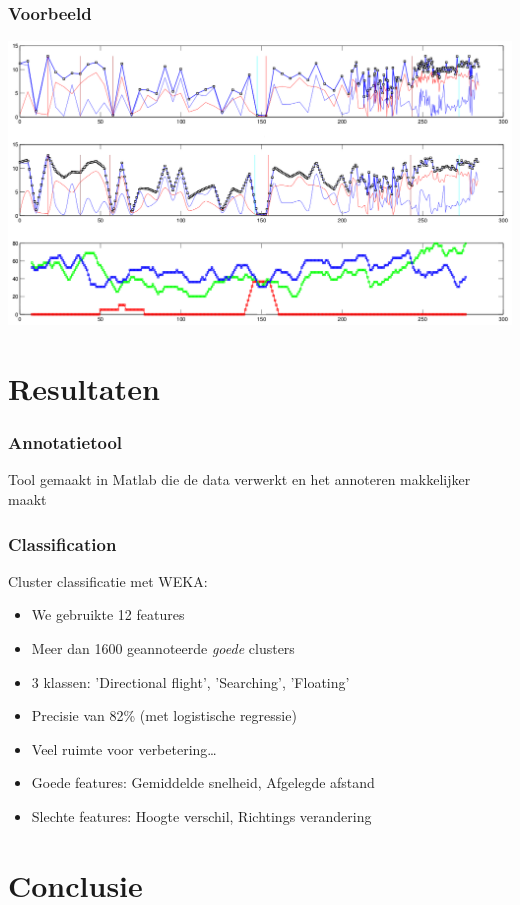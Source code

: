 \documentclass{beamer}
\newcommand{\slide}[2]
{
\begin{frame}
\frametitle{#1} 

#2

\end{frame}
}
\begin{document}
\begin{frame}
\frametitle{Voorbeeld}
\includegraphics[width=\textwidth]{clusteringPicture}
\end{frame}


\section{Resultaten}
\slide{Annotatietool}
{
	Tool gemaakt in Matlab die de data verwerkt en het annoteren makkelijker maakt
}

\slide{Classification}
{
Cluster classificatie met WEKA:
\begin{itemize}
    \item We gebruikte 12 features
    \item Meer dan 1600 geannoteerde \emph{goede} clusters
    \item 3 klassen: 'Directional flight', 'Searching', 'Floating'
    \item Precisie van 82\% (met logistische regressie)
    \item Veel ruimte voor verbetering\ldots
\end{itemize}
\vspace{1cm}
\begin{itemize}
\item Goede features: Gemiddelde snelheid, Afgelegde afstand
\item Slechte features: Hoogte verschil, Richtings verandering
\end{itemize}
}

\section{Conclusie}
\end{document}
